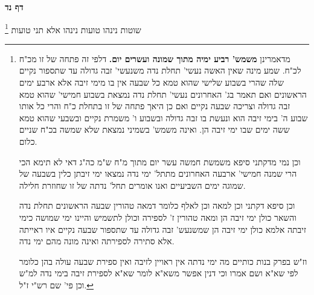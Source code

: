\documentclass[12pt, openany]{book}
\newcommand{\sethebfont}{
\fontsize{10.5pt}{21.0pt} \selectfont
}
\newcommand{\twocol}[1]{
	{\sethebfont \begin{multicols}{2}
			#1
	\end{multicols}}	
}
\newcommand{\sectname}{}
\newcommand{\newsection}[1]{
	\addcontentsline{toc}{section}{#1}
	\renewcommand{\sectname}{#1}	
	\vspace{-\baselineskip}
	\begin{center}
		\textbf{%
\fontsize{16pt}{16pt}\selectfont
			#1}
	\end{center}
	\vspace{-\baselineskip}
	\nopagebreak
}
\newcommand{\footnotecomment}[1]{\footnote{#1}}
\newcommand{\commenta}[1]{\footnotecomment{#1}}
\begin{document}
\newsection{דף נד}
\twocol{שוטות נינהו  טועות נינהו  אלא תני  טועות 
\commenta{מדאמרינן \textbf{משמש' רביע ימיה מתוך שמונה ועשרים יום.}  דלפי זה פתחה של זו מכ"ח לכ"ח. שמע מינה שאין האשה נעשי' תחלת נדה משנעשי' זבה גדולה עד שתספור נקיים שלה שהרי בשבוע שלישי שהוא טמא כל שבעה אין בו מימי זיבה אלא ארבע ימים הראשונים ואם תאמר בג' האחרונים נעשי' תחלת נדה נמצאת בשבוע חמישי' שהוא טמא זבה גדולה וצריכה שבעה נקיים ואם כן היאך פתחה של זו בתחלת כ"ח והרי כל אותו שבוע ה' בימי זיבה הוא ונעשת בו זבה גדולה ובשבוע ו' משמרת נקיים ובשבעי שהוא טמא ששה ימים שבו ימי זיבה הן. ואינה משמש' בשמיני נמצאת שלא שמשה בכ"ח שניים כלום.\par וכן נמי מדקתני סיפא משמשת חמשה עשר יום מתוך מ"ח ש"מ כה"ג דאי לא תימא הכי הרי שמנה חמישי' ארבעה האחרונים מתתל' ימי נדה נמצאו ימי זיבתן כלין בשבעה של שמוגה ימים השביעיים ואנו אומרים תחל' נדתה של זו שחוזרת חלילה.\par  וכן סיפא דקתני וכן למאה וכן לאלף כלומר דמאה טהורין שבעה הראשונים תחלת נדה והשאר כולן ימי זיבה הן ומאה טהורין ז' לספירה וכולן לתשמיש והיינו ימי שמושה כימי זיבתה אלמא כולן ימי זיבה הן שמשנעש' זבה גדולה עד שתספור שבעה נקיים איו ראייתה אלא סתירה לספירתה ואינה מונה מהם ימי נדה.\par וז"ש בפרק בנות כותיים מה ימי נדתה אין ראויין לזיבה ואין ספירת שבעה עולה בהן כלומר לפי שא"א ושם אמרו וכי דנין אפשר משא"א לומר שא"א לספירת זיבה בימי נדה למ"ש וכן פי' שם רש"י ז"ל. }

}
\end{document}
